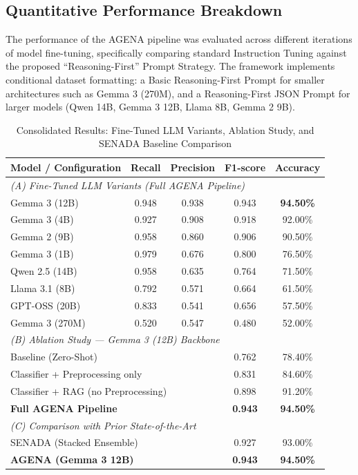 \documentclass{ieeeaccess}
\begin{document}
\subsection{Quantitative Performance Breakdown}
The performance of the AGENA pipeline was evaluated across different iterations of model fine-tuning, specifically comparing standard Instruction Tuning against the proposed ``Reasoning-First'' Prompt Strategy. The framework implements conditional dataset formatting: a Basic Reasoning-First Prompt for smaller architectures such as Gemma 3 (270M), and a Reasoning-First JSON Prompt for larger models (Qwen 14B, Gemma 3 12B, Llama 8B, Gemma 2 9B).

\begin{table}[t]
\caption{Consolidated Results: Fine-Tuned LLM Variants, Ablation Study, and SENADA Baseline Comparison}
\label{tab:results_consolidated}
\begin{center}
\begin{tabular}{|l|c|c|c|c|}
\hline
\textbf{Model / Configuration} & \textbf{Recall} & \textbf{Precision} & \textbf{F1-score} & \textbf{Accuracy} \\
\hline
\multicolumn{5}{|l|}{\textit{(A) Fine-Tuned LLM Variants (Full AGENA Pipeline)}} \\
\hline
Gemma 3 (12B) & 0.948 & 0.938 & 0.943 & \textbf{94.50\%} \\
Gemma 3 (4B) & 0.927 & 0.908 & 0.918 & 92.00\% \\
Gemma 2 (9B) & 0.958 & 0.860 & 0.906 & 90.50\% \\
Gemma 3 (1B) & 0.979 & 0.676 & 0.800 & 76.50\% \\
Qwen 2.5 (14B) & 0.958 & 0.635 & 0.764 & 71.50\% \\
Llama 3.1 (8B) & 0.792 & 0.571 & 0.664 & 61.50\% \\
GPT-OSS (20B) & 0.833 & 0.541 & 0.656 & 57.50\% \\
Gemma 3 (270M) & 0.520 & 0.547 & 0.480 & 52.00\% \\
\hline
\multicolumn{5}{|l|}{\textit{(B) Ablation Study --- Gemma 3 (12B) Backbone}} \\
\hline
\multicolumn{3}{|l|}{Baseline (Zero-Shot)} & 0.762 & 78.40\% \\
\multicolumn{3}{|l|}{Classifier + Preprocessing only} & 0.831 & 84.60\% \\
\multicolumn{3}{|l|}{Classifier + RAG (no Preprocessing)} & 0.898 & 91.20\% \\
\multicolumn{3}{|l|}{\textbf{Full AGENA Pipeline}} & \textbf{0.943} & \textbf{94.50\%} \\
\hline
\multicolumn{5}{|l|}{\textit{(C) Comparison with Prior State-of-the-Art}} \\
\hline
\multicolumn{3}{|l|}{SENADA \cite{b19} (Stacked Ensemble)} & 0.927 & 93.00\% \\
\multicolumn{3}{|l|}{\textbf{AGENA (Gemma 3 12B)}} & \textbf{0.943} & \textbf{94.50\%} \\
\hline
\end{tabular}
\end{center}
\end{table}
\end{document}
